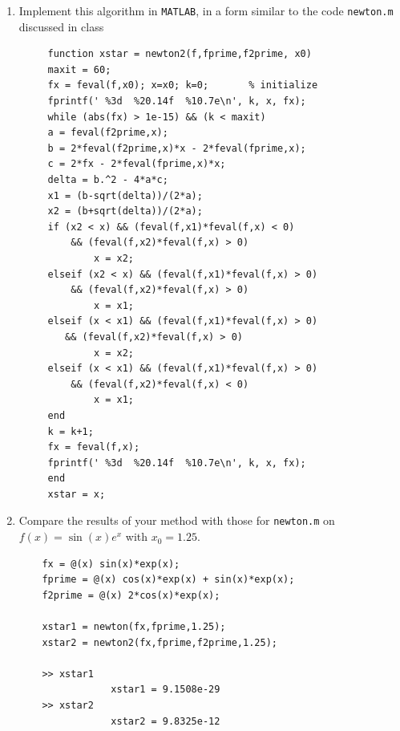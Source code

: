 \documentclass[14pt,a4paper]{article}
\begin{document}
\begin{enumerate}
	
	\label{4e}
	\item Implement this algorithm in \texttt{MATLAB}, in a form similar to the code \texttt{newton.m} discussed in class
	\begin{lstlisting}
	 function xstar = newton2(f,fprime,f2prime, x0)
	 maxit = 60; 
	 fx = feval(f,x0); x=x0; k=0;       % initialize
	 fprintf(' %3d  %20.14f  %10.7e\n', k, x, fx);
	 while (abs(fx) > 1e-15) && (k < maxit)
	 a = feval(f2prime,x);
	 b = 2*feval(f2prime,x)*x - 2*feval(fprime,x);
	 c = 2*fx - 2*feval(fprime,x)*x;
	 delta = b.^2 - 4*a*c;
	 x1 = (b-sqrt(delta))/(2*a);
	 x2 = (b+sqrt(delta))/(2*a);
	 if (x2 < x) && (feval(f,x1)*feval(f,x) < 0) 
		 && (feval(f,x2)*feval(f,x) > 0)
			 x = x2;
	 elseif (x2 < x) && (feval(f,x1)*feval(f,x) > 0) 
		 && (feval(f,x2)*feval(f,x) > 0)
			 x = x1;
	 elseif (x < x1) && (feval(f,x1)*feval(f,x) > 0) 
		&& (feval(f,x2)*feval(f,x) > 0)
			 x = x2;
	 elseif (x < x1) && (feval(f,x1)*feval(f,x) > 0) 
		 && (feval(f,x2)*feval(f,x) < 0)
			 x = x1;
	 end
	 k = k+1;  
	 fx = feval(f,x);
	 fprintf(' %3d  %20.14f  %10.7e\n', k, x, fx);
	 end
	 xstar = x;
	\end{lstlisting}
	
	
	\label{4f}
	\item Compare the results of your method with those for \texttt{newton.m} on $f(x) = \sin(x)e^x$ with $x_0 = 1.25$.
	\begin{lstlisting}
	fx = @(x) sin(x)*exp(x);
	fprime = @(x) cos(x)*exp(x) + sin(x)*exp(x);
	f2prime = @(x) 2*cos(x)*exp(x);
	
	xstar1 = newton(fx,fprime,1.25);
	xstar2 = newton2(fx,fprime,f2prime,1.25);
	
	>> xstar1
				xstar1 = 9.1508e-29
	>> xstar2
				xstar2 = 9.8325e-12
	\end{lstlisting}
	

\end{enumerate}
\end{document}
